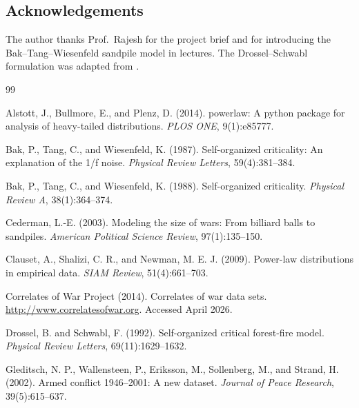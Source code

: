\documentclass[12pt,a4paper]{article}
\begin{document}
\subsection*{Acknowledgements}
The author thanks Prof.\ Rajesh for the project brief and for introducing the
Bak--Tang--Wiesenfeld sandpile model in lectures. The Drossel--Schwabl formulation was
adapted from \citet{drossel1992}.


\begin{thebibliography}{99}

Alstott, J., Bullmore, E., and Plenz, D. (2014).
\newblock powerlaw: A python package for analysis of heavy-tailed distributions.
\newblock \textit{PLOS ONE}, 9(1):e85777.

Bak, P., Tang, C., and Wiesenfeld, K. (1987).
\newblock Self-organized criticality: An explanation of the 1/f noise.
\newblock \textit{Physical Review Letters}, 59(4):381--384.

Bak, P., Tang, C., and Wiesenfeld, K. (1988).
\newblock Self-organized criticality.
\newblock \textit{Physical Review A}, 38(1):364--374.

Cederman, L.-E. (2003).
\newblock Modeling the size of wars: From billiard balls to sandpiles.
\newblock \textit{American Political Science Review}, 97(1):135--150.

Clauset, A., Shalizi, C. R., and Newman, M. E. J. (2009).
\newblock Power-law distributions in empirical data.
\newblock \textit{SIAM Review}, 51(4):661--703.

Correlates of War Project (2014).
\newblock Correlates of war data sets.
\newblock \url{http://www.correlatesofwar.org}. Accessed April 2026.

Drossel, B. and Schwabl, F. (1992).
\newblock Self-organized critical forest-fire model.
\newblock \textit{Physical Review Letters}, 69(11):1629--1632.

Gleditsch, N. P., Wallensteen, P., Eriksson, M., Sollenberg, M., and Strand, H.
  (2002).
\newblock Armed conflict 1946--2001: A new dataset.
\newblock \textit{Journal of Peace Research}, 39(5):615--637.


\end{thebibliography}
\end{document}
